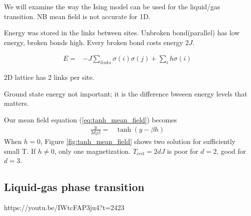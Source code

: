 \documentclass[]{article}
\begin{document}
We will examine the way the Ising model can be used for the liquid/gas transition. NB mean field is not accurate for 1D. 

Energy was stored in the links between sites. Unbroken bond(parallel) has low energy, broken bonds high. Every broken bond costs energy $2J$.

\begin{align*}
E =& -J \sum_{links} \sigma(i) \sigma(j) + \sum_{i}h\sigma(i)
\end{align*}

2D lattice has 2 links per site.

Ground state energy not important; it is the difference bweeen energy levels that matters.

Our mean field equation (\ref{eq:tanh_mean_field}) becomes
\begin{align*}
\frac{ y}{2 d j \beta} =& \tanh(y - \beta h)
\end{align*}
When $h=0$, Figure \ref{fig:tanh_mean_field} shows two solution for sufficiently small T. If $h\ne0$, only one magnetization.
$T_{crit} = 2 d J$ is poor for $d=2$, good for $d=3$.

\subsection{Liquid-gas phase transition}

https://youtu.be/IWtcFAP3ju4?t=2423
\end{document}
